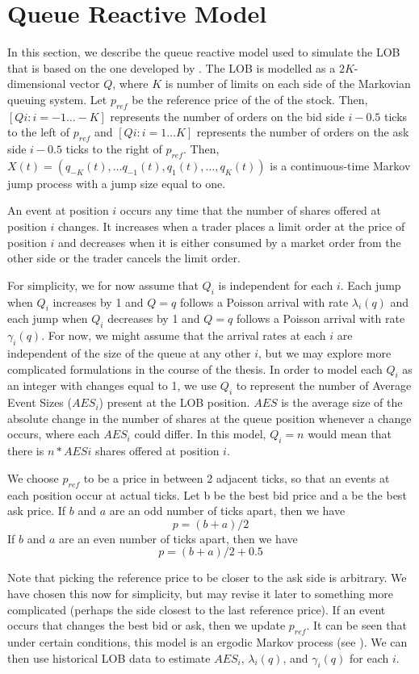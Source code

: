 \section{Queue Reactive Model} \label{modelLOB}
In this section, we describe the queue reactive model used to simulate the LOB that is based on the one developed by \cite{A6}. The LOB is modelled as a $2K$-dimensional vector $Q$, where $K$ is number of limits on each side of the Markovian queuing system. Let $p_{ref}$ be the reference price of the of the stock. Then, $[Qi: i = -1 \ldots -K]$ represents the number of orders on the bid side $i - 0.5$ ticks to the left of $p_{ref}$ and $[Qi: i =1 \ldots K]$ represents the number of orders on the ask side $i - 0.5$ ticks to the right of $p_{ref}$. Then, $X(t) = (q_{-K}(t), … q_{-1}(t), q_1(t), … , q_K(t))$ is a continuous-time Markov jump process with a jump size equal to one.


An event at position $i$ occurs any time that the number of shares offered at position $i$ changes. It increases when a trader places a limit order at the price of position $i$ and decreases when it is either consumed by a market order from the other side or the trader cancels the limit order.


For simplicity, we for now assume that $Q_i$ is independent for each $i$. Each jump when $Q_i$ increases by 1 and $Q = q$ follows a Poisson arrival with rate $\lambda_i(q)$ and each jump when $Q_i$ decreases by 1 and $Q = q$ follows a Poisson arrival with rate $\gamma_i(q)$. For now, we might assume that the arrival rates at each $i$ are independent of the size of the queue at any other $i$, but we may explore more complicated formulations in the course of the thesis. In order to model each $Q_i$ as an integer with changes equal to 1, we use $Q_i$ to represent the number of Average Event Sizes ($AES_i$) present at the LOB position. $AES$ is the average size of the absolute change in the number of shares at the queue position whenever a change occurs, where each $AES_i$ could differ. In this model, $Q_i = n$ would mean that there is $n*AESi$ shares offered at position $i$.


We choose $p_{ref}$ to be a price in between 2 adjacent ticks, so that an events at each position occur at actual ticks. Let b be the best bid price and a be the best ask price. If $b$ and $a$ are an odd number of ticks apart, then we have 
$$p=  (b+a)/2$$
If $b$ and $a$ are an even number of ticks apart, then we have
$$p=  (b+a)/2+0.5$$

Note that picking the reference price to be closer to the ask side is arbitrary. We have chosen this now for simplicity, but may revise it later to something more complicated (perhaps the side closest to the last reference price). If an event occurs that changes the best bid or ask, then we update $p_{ref}$. It can be seen that under certain conditions, this model is an ergodic Markov process (see \cite{A6}). We can then use historical LOB data to estimate $AES_i$, $\lambda_i(q)$, and $\gamma_i(q)$ for each $i$.